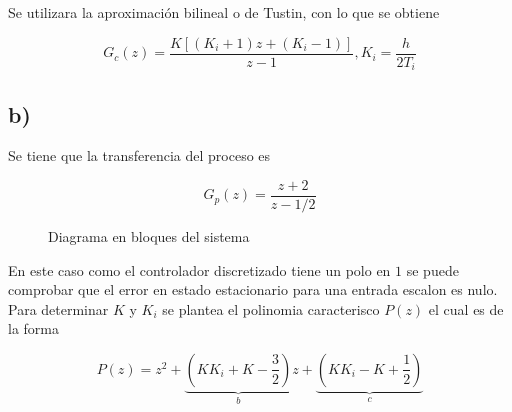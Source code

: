 \documentclass{article}
\begin{document}
    Se utilizara la aproximación bilineal o de Tustin, con lo que se obtiene 
    
    \begin{equation}
        G_c(z) = \frac{K [ (K_i + 1 )z + ( K_i - 1 ) ] }{ z - 1 }, K_i = \frac{h}{2T_i}
    \end{equation}

    \subsection{b)}

    Se tiene que la transferencia del proceso es 

    \begin{equation}
        G_p(z) = \frac{z + 2}{z - 1/2}
    \end{equation}

    \begin{figure}[!htb]
        \centering
        \caption{Diagrama en bloques del sistema}
        \label{}
    \end{figure}

    En este caso como el controlador discretizado tiene un polo en $1$ se puede comprobar que el error en estado estacionario 
    para una entrada escalon es nulo. Para determinar $K$ y $K_i$ se plantea el polinomia caracterisco $P(z)$ el cual es de la forma 

    \begin{equation}
        P(z) = z^2 + \underbrace{\left( KK_i + K - \frac{3}{2} \right)}_{b} z + \underbrace{\left( KK_i - K + \frac{1}{2} \right)}_{c}
    \end{equation}
\end{document}
